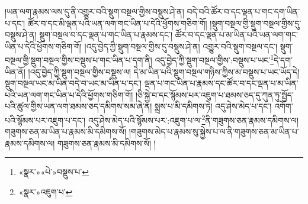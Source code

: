 །ཡན་ལག་རྣམས་ལས་དུ་ནི་འགྱུར་བའི་སྡུག་བསྔལ་གྱིས་བསྡུས་ཤེ་ན། བདེ་བའི་ཚོར་བ་དང་ལྡན་པ་གང་དག་ཡིན་པ་དང་། ཚོར་བ་དང་མི་ལྡན་པའི་ཡན་ལག་གང་ཡིན་པ་དེའི་ཕྱོགས་གཅིག་གོ། །སྡུག་བསྔལ་གྱི་སྡུག་བསྔལ་གྱིས་དུ་བསྡུས་ཤེ་ན། སྡུག་བསྔལ་བ་དང་ལྡན་པ་གང་ཡིན་པ་རྣམས་དང་། ཚོར་བ་དང་ལྡན་པ་མ་ཡིན་པའི་ཡན་ལག་གང་ཡིན་པ་དེའི་ཕྱོགས་གཅིག་གོ། །འདུ་བྱེད་ཀྱི་སྡུག་བསྔལ་གྱིས་དུ་བསྡུས་ཤེ་ན། འགྱུར་བའི་སྡུག་བསྔལ་དང་། སྡུག་བསྔལ་གྱི་སྡུག་བསྔལ་གྱིས་བསྡུས་པ་གང་ཡིན་པ་དག་ནི། འདུ་བྱེད་ཀྱི་སྡུག་བསྔལ་གྱིས་:བསྡུས་པ་ཡང་\footnote{«སྣར་»«པེ་»བསྡུས་པ་}དེ་དག་ཡིན་ནོ། །འདུ་བྱེད་ཀྱི་སྡུག་བསྔལ་གྱིས་བསྡུས་ལ། དེ་མ་ཡིན་པའི་སྡུག་བསྔལ་གཉིས་ཀྱིས་མ་བསྡུས་པ་ཡང་ཡོད་དེ། སྡུག་བསྔལ་ཡང་མ་ཡིན་བདེ་བ་ཡང་མ་ཡིན་པ་དང་། ལྡན་པ་གང་ཡིན་པ་རྣམས་དང་ཚོར་བ་དང་ལྡན་པ་མ་ཡིན་པའི་ཡན་ལག་གང་ཡིན་པ་དེའི་ཕྱོགས་གཅིག་གོ། །ཅི་སྐྱེ་བ་དང་སྙོམས་པར་འཇུག་པ་ཐམས་ཅད་དུ་ཀུན་ཏུ་སྤྱོད་པའི་ཚུལ་གྱིས་ཡན་ལག་ཐམས་ཅད་དམིགས་སམ་ཞེ་ན། སྨྲས་པ་མི་དམིགས་ཏེ། འདུ་ཤེས་མེད་པ་དང་། འགོག་པའི་སྙོམས་པར་འཇུག་པ་དང་། འདུ་ཤེས་མེད་པའི་སྙོམས་པར་:འཇུག་པ་ལ་\footnote{«སྣར་»འཇུག་པ་}ནི་གཟུགས་ཅན་རྣམས་དམིགས་ལ། གཟུགས་ཅན་མ་ཡིན་པ་རྣམས་མི་དམིགས་སོ། །གཟུགས་མེད་པ་རྣམས་སུ་སྐྱེས་པ་ལ་ནི་གཟུགས་ཅན་མ་ཡིན་པ་རྣམས་དམིགས་ལ། གཟུགས་ཅན་རྣམས་མི་དམིགས་སོ། །
